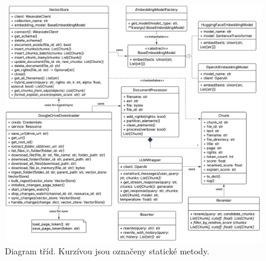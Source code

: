 \begin{figure}[H]
    \centering
    \includegraphics[width=1\linewidth]{obrazky/RAG class diagram.pdf}
    \caption{Diagram tříd. Kurzívou jsou označeny statické metody.}
    \label{fig:class}
\end{figure}

